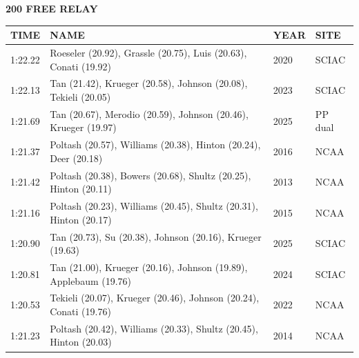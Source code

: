 \begin{table}[H]
\centering
\begin{minipage}[t]{0.6\textwidth}
\centering
\textbf{200 FREE RELAY}\\[0.1cm]
\begin{tabular}{@{}p{1.8cm}p{2.8cm}p{1.2cm}p{1.4cm}@{}}
\hline
    \textbf{TIME} & \textbf{NAME} & \textbf{YEAR} & \textbf{SITE} \\
\hline
    1:22.22 & Roeseler (20.92), Grassle (20.75), Luis (20.63), Conati (19.92) & 2020 & SCIAC \\
    1:22.13 & Tan (21.42), Krueger (20.58), Johnson (20.08), Tekieli (20.05) & 2023 & SCIAC \\
    1:21.69 & Tan (20.67), Merodio (20.59), Johnson (20.46), Krueger (19.97) & 2025 & PP dual \\
    1:21.37 & Poltash (20.57), Williams (20.38), Hinton (20.24), Deer (20.18) & 2016 & NCAA \\
    1:21.42 & Poltash (20.38), Bowers (20.68), Shultz (20.25), Hinton (20.11) & 2013 & NCAA \\
    1:21.16 & Poltash (20.23), Williams (20.45), Shultz (20.31), Hinton (20.17) & 2015 & NCAA \\
    1:20.90 & Tan (20.73), Su (20.38), Johnson (20.16), Krueger (19.63) & 2025 & SCIAC \\
    1:20.81 & Tan (21.00), Krueger (20.16), Johnson (19.89), Applebaum (19.76) & 2024 & SCIAC \\
    1:20.53 & Tekieli (20.07), Krueger (20.46), Johnson (20.24), Conati (19.76) & 2022 & NCAA \\
    1:21.23 & Poltash (20.42), Williams (20.33), Shultz (20.45), Hinton (20.03) & 2014 & NCAA \\
\hline
\end{tabular}
\end{minipage}
\end{table}

